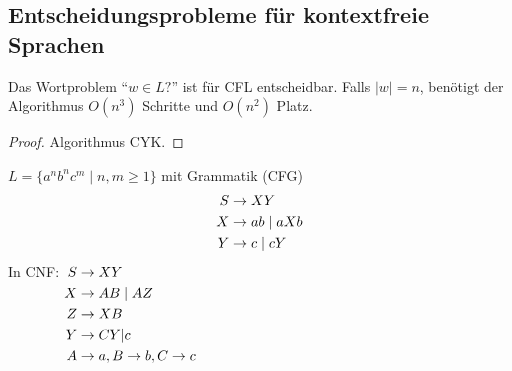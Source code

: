 \subsection{Entscheidungsprobleme für kontextfreie Sprachen}
\begin{Satz}[name={[Wortproblem für \acs*{CFL} entscheidbar]}]
	Das Wortproblem "`$w\in L?$"' ist für \ac{CFL} entscheidbar. Falls $|w|=n$, benötigt der Algorithmus $O(n^3)$ Schritte und $O(n^2)$ Platz.
\end{Satz}
\begin{proof}
	Algorithmus \ac{CYK}.
\end{proof}
\begin{Bsp}
	$L=\{a^nb^nc^m \mid n,m\geq 1\}$ mit Grammatik (\acs{CFG})
	\begin{align*}
		S &\-> XY\\
		X &\-> ab \mid aXb\\
		Y &\-> c \mid cY
	\end{align*}
	In CNF:
	$\begin{aligned}[t]
		S &\-> XY\\
		X &\-> AB \mid AZ\\
		Z &\-> XB\\
		Y &\-> CY | c\\
		A &\-> a, B \-> b, C \-> c
	\end{aligned}$
\end{Bsp}

